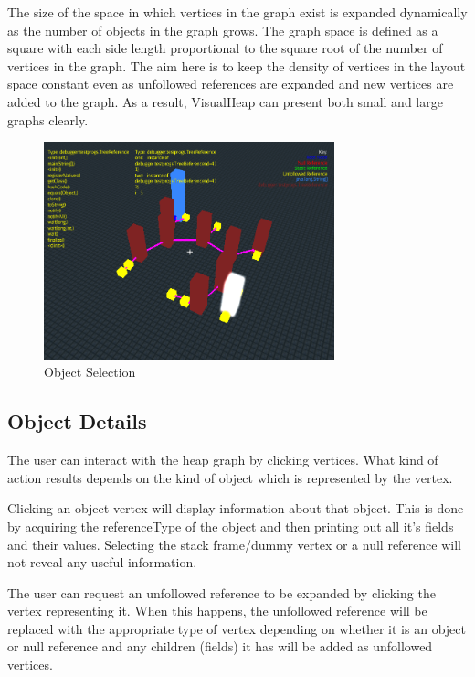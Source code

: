 \documentclass[11pt, a4paper]{report}
\begin{document}
The size of the space in which vertices in the graph exist is expanded dynamically as the number of objects in the graph grows.  The graph space is defined as a square with each side length proportional to the square root of the number of vertices in the graph. The aim here is to keep the density of vertices in the layout space constant even as unfollowed references are expanded and new vertices are added to the graph. As a result, VisualHeap can present both small and large graphs clearly.

\begin{figure}[h]
        \centering
        \includegraphics[width=0.75\textwidth]{images/final/dynamicoff.png}
        \caption{Object Selection}
\end{figure}

\subsection{Object Details}

The user can interact with the heap graph by clicking vertices. What kind of action results depends on the kind of object which is represented by the vertex.

Clicking an object vertex will display information about that object. This is done by acquiring the referenceType of the object and then printing out all it’s fields and their values. Selecting the stack frame/dummy vertex or a null reference will not reveal any useful information.

The user can request an unfollowed reference to be expanded by clicking the vertex representing it. When this happens, the unfollowed reference will be replaced with the appropriate type of vertex depending on whether it is an object or null reference and any children (fields) it has will be added as unfollowed vertices.
\end{document}

